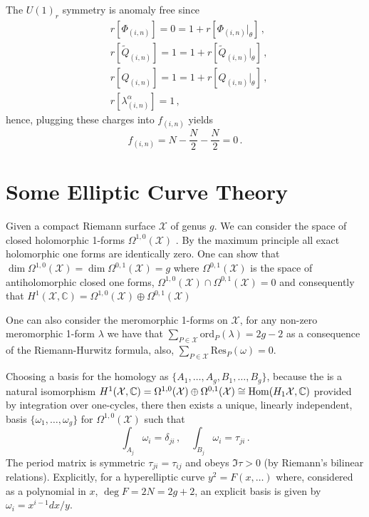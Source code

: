 \documentclass[main.tex]{subfiles}
\begin{document}
The $U(1)_r$ symmetry is anomaly free since 
\begin{align}
&r[\Phi_{(i,n)}]=0=1+r[\Phi_{(i,n)}|_{\theta}]\,,\\
&r[\widetilde{Q}_{(i,n)}]=1=1+r[\widetilde{Q}_{(i,n)}|_{\theta}]\,,\\
&r[Q_{(i,n)}]=1=1+r[Q_{(i,n)}|_{\theta}]\,,\\
&r[\lambda^{\alpha}_{(i,n)}]=1\,,
\end{align}
hence, plugging these charges into $f_{(i,n)}$ yields
\begin{equation}
f_{(i,n)}=N-\frac{N}{2}-\frac{N}{2}=0\,.
\end{equation}
\section{Some Elliptic Curve Theory}\label{Chap:AppEllcurve}
Given a compact Riemann surface $\mathcal{X}$ of genus $g$. We can consider the space of closed holomorphic 1-forms $\Omega^{1,0}(\mathcal{X})$ \cite{koblitz1993introduction}. By the maximum principle all exact holomorphic one forms are identically zero. One can show that $\dim\Omega^{1,0}(\mathcal{X})=\dim\Omega^{0,1}(\mathcal{X})=g$ where $\Omega^{0,1}(\mathcal{X})$ is the space of antiholomorphic closed one forms, $\Omega^{1,0}(\mathcal{X})\cap\Omega^{0,1}(\mathcal{X})=0$ and consequently that $H^1(\mathcal{X},\mathbb{C})=\Omega^{1,0}(\mathcal{X})\oplus\Omega^{0,1}(\mathcal{X})$

One can also consider the meromorphic 1-forms on $\mathcal{X}$, for any non-zero meromorphic 1-form $\lambda$ we have that $\sum_{P\in \mathcal{X}}\text{ord}_P(\lambda)=2g-2$ as a consequence of the Riemann-Hurwitz formula, also, $\sum_{P\in \mathcal{X}}\text{Res}_P(\omega)=0$. 

Choosing a basis for the homology as $\{A_1,\dots,A_g,B_1,\dots,B_g\}$, because the is a natural isomorphism $H^1(\mathcal{X},\mathbb{C})=\Omega^{1,0}(\mathcal{X})\oplus\Omega^{0,1}(\mathcal{X})\cong\operatorname{Hom}(H_1\mathcal{X},\mathbb{C})$ provided by integration over one-cycles, there then exists a unique, linearly independent, basis $\{\omega_1,\dots,\omega_g \}$ for $\Omega^{1,0}(\mathcal{X})$ such that
\begin{equation}
\int_{A_j}\omega_i=\delta_{ji}\label{eqn:periodA}\,,\quad \int_{B_j}\omega_i=\tau_{ji}\,.
\end{equation}
The period matrix is symmetric $\tau_{ji}=\tau_{ij}$ and obeys $\Im \tau>0$ (by Riemann's bilinear relations).
Explicitly, for a hyperelliptic curve $y^2=F(x,\dots)$ where, considered as a polynomial in $x$, $\deg F=2N=2g+2$, an explicit basis is given by $\omega_i=x^{i-1}dx/y$.
\end{document}
